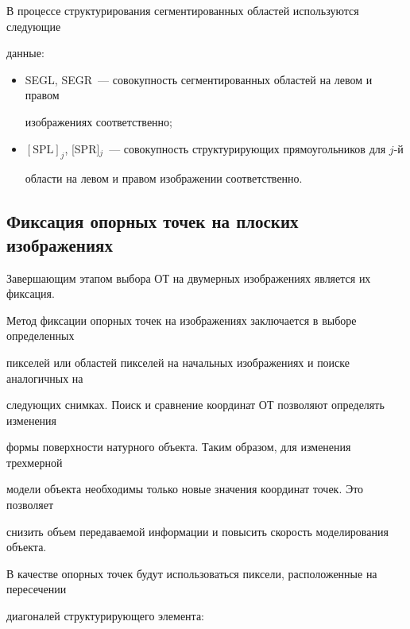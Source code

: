      


В процессе структурирования сегментированных областей используются следующие 


данные:


\begin{itemize}


\item SEGL, SEGR~--- совокупность сегментированных областей на левом и правом 


изображениях соответственно;


\item $[\mathrm{SPL}]_j$, [SPR]$_j$~--- совокупность структурирующих прямоугольников для $j$-й 


области на левом и правом изображении соответственно.


\end{itemize}





\subsection{Фиксация опорных точек на плоских изображениях} %





Завершающим этапом выбора ОТ на двумерных изображениях является их фиксация.





Метод фиксации опорных точек на изображениях заключается в выборе определенных 


пикселей или областей пикселей на начальных изображениях и поиске аналогичных на 


следующих снимках. Поиск и сравнение координат ОТ позволяют определять изменения 


формы поверхности натурного объекта. Таким образом, для изменения трехмерной 


модели объекта необходимы только новые значения координат точек. Это позволяет 


снизить объем передаваемой информации и повысить скорость моделирования объекта.





В качестве опорных точек будут использоваться пиксели, расположенные на пересечении 


диагоналей структурирующего элемента:


$$


